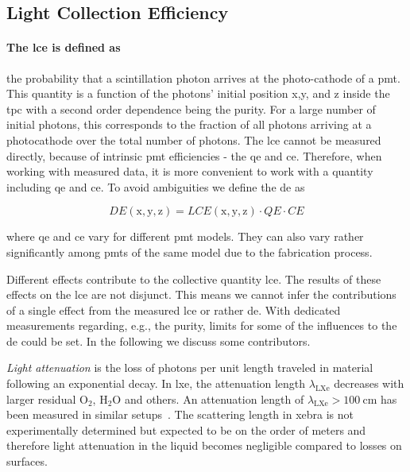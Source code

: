 
\FloatBarrier
\subsection{Light Collection Efficiency}
\label{ssec:lce}
\FloatBarrier



\paragraph{The \gls{lce} is defined as} the probability that a scintillation photon arrives at the photo-cathode of a \gls{pmt}.
This quantity is a function of the photons' initial position x,y, and z inside the \gls{tpc} with a second order dependence being the purity.
For a large number of initial photons, this corresponds to the fraction of all photons arriving at a photocathode over the total number of photons.
The \gls{lce} cannot be measured directly, because of intrinsic \gls{pmt} efficiencies - the \gls{qe} and \gls{ce}.
Therefore, when working with measured data, it is more convenient to work with a quantity including \gls{qe} and \gls{ce}.
To avoid ambiguities we define the \gls{de} as


\begin{equation}
    \mathit{DE}\left(\mathrm{x}, \mathrm{y}, \mathrm{z}\right) =  \mathit{LCE}\left(\mathrm{x}, \mathrm{y}, \mathrm{z}\right) \cdot \mathit{QE} \cdot \mathit{CE}
\end{equation}

where \gls{qe} and \gls{ce} vary for different \gls{pmt} models.
They can also vary rather significantly among \glspl{pmt} of the same model due to the fabrication process.

Different effects contribute to the collective quantity \gls{lce}.
The results of these effects on the \gls{lce} are not disjunct.
This means we cannot infer the contributions of a single effect from the measured \gls{lce} or rather \gls{de}.
With dedicated measurements regarding, e.g., the purity, limits for some of the influences to the \gls{de} could be set.
In the following we discuss some contributors.

\emph{Light attenuation} is the loss of photons per unit length traveled in material following an exponential decay.
In \gls{lxe}, the attenuation length $ \lambda_\mathrm{LXe} $ decreases with larger residual $ \mathrm{O}_2 $, $ \mathrm{H}_2\mathrm{O} $ and others.
An attenuation length of $ \lambda_\mathrm{LXe} > \SI{100}{\centi\m} $ has been measured in similar setups~\cite{Baldini05}.
The scattering length in \gls{xebra} is not experimentally determined but expected to be on the order of meters and therefore light attenuation in the liquid becomes negligible compared to losses on surfaces.

